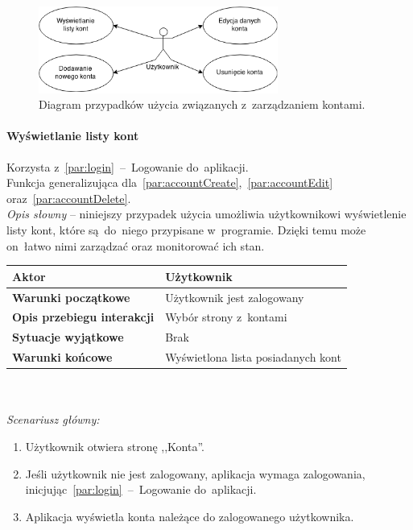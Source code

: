 \begin{figure}[H]
  \centering
  \includegraphics[width=0.7\textwidth]{images/use-cases-accounts.png}
  \caption{Diagram przypadków użycia związanych z~zarządzaniem kontami.}
\end{figure}

\paragraph{Wyświetlanie listy kont\newline}
\label{par:accountsView}
Korzysta z~\ref{par:login}~--~Logowanie do~aplikacji.\\
\indent Funkcja generalizująca dla~\ref{par:accountCreate},~\ref{par:accountEdit} oraz~\ref{par:accountDelete}.\\

\textit{Opis słowny} -- niniejszy przypadek użycia umożliwia użytkownikowi wyświetlenie listy kont, które są~do~niego przypisane w~programie. Dzięki temu może on~łatwo nimi zarządzać oraz monitorować ich stan.\\

\begin{tabular}{|l|l|}
  \hline \textbf{Aktor} & Użytkownik \\ \hline
  \textbf{Warunki początkowe} & Użytkownik jest zalogowany \\ \hline
  \textbf{Opis przebiegu interakcji} & Wybór strony z~kontami \\ \hline
  \textbf{Sytuacje wyjątkowe} & Brak \\ \hline
  \textbf{Warunki końcowe} & Wyświetlona lista posiadanych kont \\ \hline
\end{tabular}\\\\

\noindent \textit{Scenariusz główny:}
\begin{enumerate}
  \item Użytkownik otwiera stronę ,,Konta''.
  \item Jeśli użytkownik nie jest zalogowany, aplikacja wymaga zalogowania, inicjując~\ref{par:login}~--~Logowanie do~aplikacji.
  \item Aplikacja wyświetla konta należące do zalogowanego użytkownika.
\end{enumerate}

